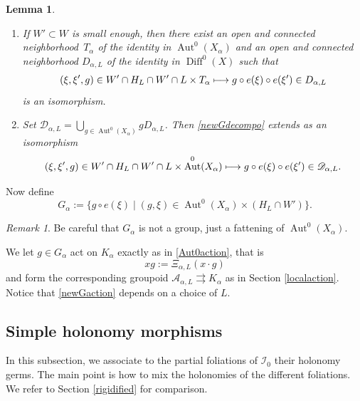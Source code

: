 \documentclass[10pt]{amsart}
\let\mathcal\mathscr
\def\mto{\mathchoice{\longmapsto}{\mapsto}{\mapsto}{\mapsto}}
\DeclareMathOperator{\Aut}{Aut}
\DeclareMathOperator{\Diff}{Diff}
\theoremstyle{plain}
\newtheorem{lemma}[theorem]{Lemma}
\theoremstyle{definition}
\theoremstyle{remark}
\newtheorem{remark}[theorem]{Remark}
\numberwithin{equation}{section}
\newcommand{\cI}{\mathcal{I}}
\providecommand{\skpt}{\par\smallskip\noindent}
\begin{document}
\skpt\begin{lemma}
\label{newGdecompolemma}
\begin{enumerate}
\item
If $W'\subset W$ is small enough, then there exist an open and connected neighborhood~$T_\alpha$ of the identity in $\Aut^0(X_\alpha)$ and an open and connected neighborhood $D_{\alpha,L}$ of the identity in $\Diff^0(X)$ such that
\begin{equation}
\label{newGdecompo}
(\xi,\xi',g)\in W'\cap H_L\cap W'\cap L\times T_\alpha\mto g\circ e(\xi)\circ e(\xi')\in D_{\alpha,L}
\end{equation}
is an isomorphism.
\item
Set $\mathcal D_{\alpha,L}=\bigcup_{g\in \Aut^0(X_\alpha)}gD_{\alpha,L}$. Then \eqref{newGdecompo} extends as an isomorphism
\begin{equation}
\label{newGdecompoglobal}
(\xi,\xi',g)\in W'\cap H_L\cap W'\cap L\times \Aut^0(X_\alpha)\mto g\circ e(\xi)\circ e(\xi')\in \mathcal D_{\alpha,L}.
\end{equation}
\end{enumerate}
\end{lemma}

Now define
\begin{equation}
\label{newG}
G_\alpha:=\{g\circ e(\xi)\mid (g,\xi)\in\Aut^0(X_\alpha)\times (H_L\cap W')\}.
\end{equation}

\begin{remark}
\label{notagroup}
Be careful that $G_\alpha$ is not a group, just a fattening of $\Aut^0(X_\alpha)$.
\end{remark}
We let $g\in G_\alpha$ act on $K_\alpha$ exactly as in \eqref{Aut0action}, that is
\begin{equation}
\label{newGaction}
xg:=\Xi_{\alpha, L}(x\cdot g)
\end{equation}
and form the corresponding groupoid $\mathcal A_{\alpha,L}\rightrightarrows K_\alpha$ as in Section \ref{localaction}. Notice that \eqref{newGaction} depends on a choice of $L$.

\subsection{Simple holonomy morphisms}
\label{simpleholonomy}

In this subsection, we associate to the partial foliations of $\cI_0$ their holonomy germs. The main point is how to mix the holonomies of the different foliations. We refer to Section \ref{rigidified} for comparison.
\end{document}
